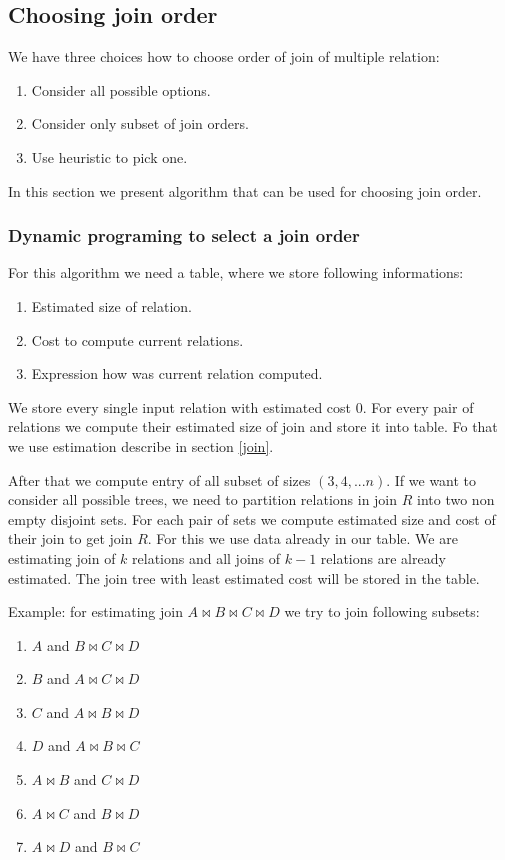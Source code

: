 \subsection{Choosing join order}
\label{joinOrder}
 We have three choices how to choose order of join of multiple relation:
\begin{enumerate}
\item Consider all possible options.
\item Consider only subset of join orders.
\item Use heuristic to pick one.
\end{enumerate}
 
In this section we present algorithm that can be used for choosing join order.
 
\subsubsection{Dynamic programing to select a join order}
\label{dymanicalgorithm}
For this algorithm we need a table, where we store following informations:
 
\begin{enumerate}
\item Estimated size of relation.
\item Cost to compute current relations.
\item Expression how was current relation computed.
\end{enumerate}

We store every single input relation with estimated cost 0. For every pair of relations we compute their estimated size of join and store it into table. Fo that we use estimation describe in section \ref{join}.  

After that we compute entry of all subset of sizes $(3,4,...n)$.
If we want to consider all possible trees, we need to partition relations in join $R$ into two non empty disjoint sets. For each pair of sets we compute estimated size and cost of their join to get join $R$. For this we use data already in our table. We are estimating join of $k$ relations and all joins of $k-1$ relations are already estimated. The join tree with least estimated cost will be stored in the table.

Example: for estimating join $A\Join B\Join C\Join D$ we try to join following subsets:
\begin{enumerate}
\item $A$ and $B\Join C\Join D$
\item $B$ and $A\Join C\Join D$
\item $C$ and $A\Join B\Join D$
\item $D$ and $A\Join B\Join C$
\item $A\Join B$ and $C\Join D$
\item $A\Join C$ and $B\Join D$
\item $A\Join D$ and $B\Join C$

\end{enumerate}

